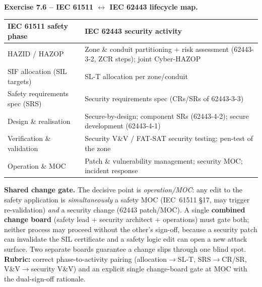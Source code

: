 \documentclass[11pt,a4paper]{article}
\begin{document}
\begin{solutionbox}
\textbf{Exercise 7.6 -- IEC 61511 $\leftrightarrow$ IEC 62443 lifecycle map.}
\smallskip
\renewcommand{\arraystretch}{1.25}
\footnotesize
\setlength{\tabcolsep}{4pt}
\noindent\par\begin{tabular}{@{}p{5.0cm}p{8.5cm}@{}}
\toprule
\textbf{IEC 61511 safety phase} & \textbf{IEC 62443 security activity} \\
\midrule
HAZID / HAZOP & Zone \& conduit partitioning + risk assessment (62443-3-2,
  ZCR steps); joint Cyber-HAZOP \\
SIF allocation (SIL targets) & SL-T allocation per zone/conduit \\
Safety requirements spec (SRS) & Security requirements spec (CRs/SRs of
  62443-3-3) \\
Design \& realisation & Secure-by-design; component SRs (62443-4-2); secure
  development (62443-4-1) \\
Verification \& validation & Security V\&V / FAT-SAT security testing; pen-test
  of the zone \\
Operation \& MOC & Patch \& vulnerability management; security MOC; incident
  response \\
\bottomrule
\end{tabular}
\smallskip
\textbf{Shared change gate.} The decisive point is \emph{operation/MOC}: any
edit to the safety application is \emph{simultaneously} a safety MOC (IEC~61511
\S17, may trigger re-validation) \emph{and} a security change (62443 patch/MOC).
A single \textbf{combined change board} (safety lead + security architect +
operations) must gate both; neither process may proceed without the other's
sign-off, because a security patch can invalidate the SIL certificate and a
safety logic edit can open a new attack surface. Two separate boards guarantee a
change slips through one blind spot.
\textbf{Rubric:} correct phase-to-activity pairing (allocation$\to$SL-T,
SRS$\to$CR/SR, V\&V$\to$security V\&V) and an explicit single change-board gate
at MOC with the dual-sign-off rationale.
\end{solutionbox}
\end{document}
